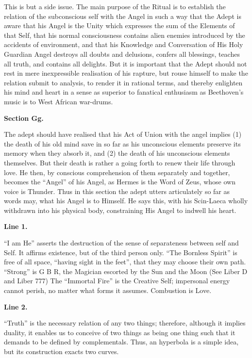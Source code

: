 This is but a side issue. The main purpose of the Ritual is to establish the relation of the subconscious self with the Angel in such a way that the Adept is aware that his Angel is the Unity which expresses the sum of the Elements of that Self, that his normal consciousness contains alien enemies introduced by the accidents of environment, and that his Knowledge and Conversation of His Holy Guardian Angel destroys all doubts and delusions, confers all blessings, teaches all truth, and contains all delights. But it is important that the Adept should not rest in mere inexpressible realisation of his rapture, but rouse himself to make the relation submit to analysis, to render it in rational terms, and thereby enlighten his mind and heart in a sense as superior to fanatical enthusiasm as Beethoven's music is to West African war-drums.


\pagebreak[1]
\textbf{Section Gg.}


The adept should have realised that his Act of Union with the angel implies (1) the death of his old mind save in so far as his unconscious elements preserve its memory when they absorb it, and (2) the death of his unconscious elements themselves. But their death is rather a going forth to renew their life through love. He then, by conscious comprehension of them separately and together, becomes the \enquote{Angel} of his Angel, as Hermes is the Word of Zeus, whose own voice is Thunder. Thus in this section the adept utters articulately so far as words may, what his Angel is to Himself. He says this, with his Scin-Laeca wholly withdrawn into his physical body, constraining His Angel to indwell his heart.


\pagebreak[1]
\textbf{Line 1.}


\enquote{I am He} asserts the destruction of the sense of separateness between self and Self. It affirms existence, but of the third person only. \enquote{The Bornless Spirit} is free of all space, \enquote{having sight in the feet}, that they may choose their own path. \enquote{Strong} is G B R, the Magician escorted by the Sun and the Moon (See Liber D and Liber 777) The \enquote{Immortal Fire} is the Creative Self; impersonal energy cannot perish, no matter what forms it assumes. Combustion is Love.


\textbf{Line 2.}


\enquote{Truth} is the necessary relation of any two things; therefore, although it implies duality, it enables us to conceive of two things as being one thing such that it demands to be defined by complementals. Thus, an hyperbola is a simple idea, but its construction exacts two curves.


